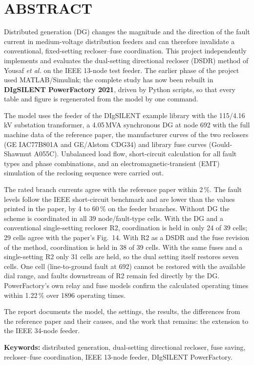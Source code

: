 \documentclass[12pt,letterpaper]{article}
\newcommand{\fronthead}[1]{\clearpage\phantomsection\section*{#1}\addcontentsline{toc}{section}{#1}}
\newcommand{\PF}{PowerFactory}
\begin{document}
\fronthead{ABSTRACT}
Distributed generation (DG) changes the magnitude and the direction of the fault current in medium-voltage
distribution feeders and can therefore invalidate a conventional, fixed-setting recloser--fuse coordination.
This project independently implements and evaluates the dual-setting directional recloser (DSDR) method of
Yousaf \textit{et al.} on the IEEE 13-node test feeder. The earlier phase of the project used
MATLAB/Simulink; the complete study has now been rebuilt in \textbf{DIgSILENT \PF{} 2021}, driven by Python
scripts, so that every table and figure is regenerated from the model by one command.

The model uses the feeder of the DIgSILENT example library with the 115/4.16\,kV substation transformer, a
4.05\,MVA synchronous DG at node 692 with the full machine data of the reference paper, the manufacturer
curves of the two reclosers (GE IAC77B801A and GE/Alstom CDG34) and library fuse curves (Gould-Shawmut
A055C). Unbalanced load flow, short-circuit calculation for all fault types and phase combinations, and an
electromagnetic-transient (EMT) simulation of the reclosing sequence were carried out.

The rated branch currents agree with the reference paper within 2\,\%. The fault levels follow the IEEE
short-circuit benchmark and are lower than the values printed in the paper, by 4 to 60\,\% on the feeder
branches. Without DG the
scheme is coordinated in all 39 node/fault-type cells. With the DG and a conventional single-setting
recloser R2, coordination is held in only 24 of 39 cells; 29 cells agree with
the paper's Fig.~14. With R2 as a DSDR and the fuse revision of the method, coordination is held in
38 of 39 cells. With the same fuses and a single-setting R2 only 31 cells are
held, so the dual setting itself restores seven cells. One cell (line-to-ground fault at 692) cannot be
restored with the available dial range, and faults downstream of R2 remain fed directly by the DG.
\PF's own relay and fuse models confirm the calculated operating times within 1.22\,\% over
1896 operating times.

The report documents the model, the settings, the results, the differences from the reference paper and
their causes, and the work that remains: the extension to the IEEE 34-node feeder.

\textbf{Keywords:} distributed generation, dual-setting directional recloser, fuse saving, recloser--fuse
coordination, IEEE 13-node feeder, DIgSILENT \PF.
\end{document}
